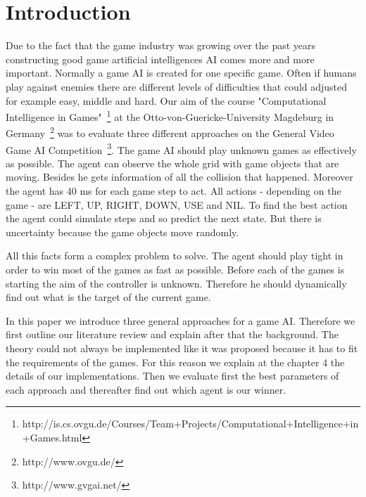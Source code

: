 \section{Introduction} 
\label{sec:intro}


Due to the fact that the game industry was growing over the past years~\cite{gartner}
constructing good game artificial intelligences \ac{AI} comes more and more important.
Normally a game \ac{AI} is created for one specific game. Often if humans play against
enemies there are different levels of difficulties that could adjusted for example easy, middle and hard.
Our aim of the course "Computational Intelligence in Games"~\footnote{http://is.cs.ovgu.de/Courses/Team+Projects/Computational+Intelligence+in+Games.html} at the Otto-von-Guericke-University Magdeburg in Germany~\footnote{http://www.ovgu.de/} was
to evaluate three different approaches on the General Video Game AI Competition~\footnote{http://www.gvgai.net/}.
The game AI should play unknown games as effectively as possible. The agent can observe the
whole grid with game objects that are moving. Besides he gets information of all the collision that happened.
Moreover the agent has 40 ms for each game step to act. All actions - depending on the game - are  LEFT, UP, RIGHT, DOWN, USE and NIL.
To find the best action the agent could simulate steps and so predict the next state. But there is uncertainty because the game objects move randomly.

All this facts form a complex problem to solve. The agent should play tight in order to win most of the games as fast as possible. 
Before each of the games is starting the aim of the controller is unknown. Therefore he should dynamically find out what is the target of the current game.

In this paper we introduce three general approaches for a game \ac{AI}. Therefore we first outline our literature review and explain after that
the background. The theory could not always be implemented like it was proposed because it has to
fit the requirements of the games. For this reason we explain at the chapter 4 the details of our implementations.
Then we evaluate first the best parameters of each approach and thereafter find out which agent is our winner.








